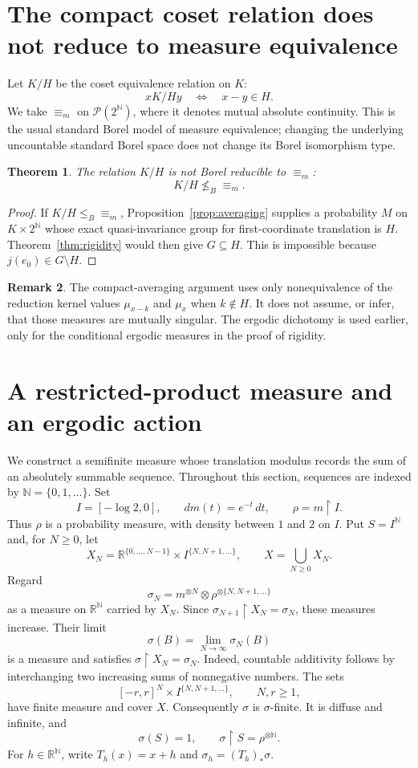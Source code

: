 \documentclass[11pt]{article}
\newtheorem{theorem}{Theorem}[section]
\theoremstyle{definition}
\newtheorem{remark}[theorem]{Remark}
\newcommand{\N}{\mathbb N}
\newcommand{\R}{\mathbb R}
\newcommand{\Prob}{\mathcal P}
\newcommand{\ME}{\mathrel{\equiv_m}}
\newcommand{\leB}{\mathrel{\leq_B}}
\newcommand{\nleB}{\mathrel{\nleq_B}}
\begin{document}
\section{The compact coset relation does not reduce to measure equivalence}
\label{sec:coset-nonreduction}

Let $K/H$ be the coset equivalence relation on $K$:
\[
 x\mathrel{K/H}y\quad\Longleftrightarrow\quad x-y\in H.
\]
We take $\ME$ on $\Prob(2^{\N})$, where it denotes mutual absolute
continuity. This is the usual standard Borel model of measure
equivalence; changing the underlying uncountable standard Borel space
does not change its Borel isomorphism type.

\begin{theorem}\label{thm:nonreduction}
The relation $K/H$ is not Borel reducible to $\ME$:
\[
 K/H\nleB\ME.
\]
\end{theorem}

\begin{proof}
If $K/H\leB{\equiv_m}$, Proposition~\ref{prop:averaging} supplies a
probability $M$ on $K\times2^\N$ whose exact quasi-invariance group
for first-coordinate translation is $H$. Theorem~\ref{thm:rigidity}
would then give $G\subseteq H$. This is impossible because
$j(e_0)\in G\setminus H$.
\end{proof}

\begin{remark}
The compact-averaging argument uses only nonequivalence of the reduction
kernel values $\mu_{x-k}$ and $\mu_x$ when $k\notin H$. It does not
assume, or infer, that those measures
are mutually singular. The ergodic dichotomy is used earlier, only
for the conditional ergodic measures in the proof of rigidity.
\end{remark}
\section{A restricted-product measure and an ergodic action}
\label{sec:restricted-product}

We construct a semifinite measure whose translation modulus records the
sum of an absolutely summable sequence. Throughout this section, sequences
are indexed by $\N=\{0,1,\ldots\}$.
Set
\[
 I=[-\log 2,0],\qquad dm(t)=e^{-t}\,dt,\qquad \rho=m\mathbin{\upharpoonright}I.
\]
Thus $\rho$ is a probability measure, with density between $1$ and $2$ on
$I$. Put $S=I^{\N}$ and, for $N\geq0$, let
\[
 X_N=\R^{\{0,\ldots,N-1\}}\times I^{\{N,N+1,\ldots\}},
 \qquad X=\bigcup_{N\geq0}X_N.
\]
Regard
\[
 \sigma_N=m^{\otimes N}\otimes\rho^{\otimes\{N,N+1,\ldots\}}
\]
as a measure on $\R^{\N}$ carried by $X_N$. Since
$\sigma_{N+1}\mathbin{\upharpoonright}X_N=\sigma_N$, these measures increase.
Their limit
\[
 \sigma(B)=\lim_{N\to\infty}\sigma_N(B)
\]
is a measure and satisfies $\sigma\mathbin{\upharpoonright}X_N=\sigma_N$.
Indeed, countable additivity follows by interchanging two increasing sums
of nonnegative numbers. The sets
\[
 [-r,r]^N\times I^{\{N,N+1,\ldots\}},\qquad N,r\geq1,
\]
have finite measure and cover $X$. Consequently $\sigma$ is
$\sigma$-finite. It is diffuse and infinite, and
\[
 \sigma(S)=1,\qquad \sigma\mathbin{\upharpoonright}S=\rho^{\otimes\N}.
\]
For $h\in\R^{\N}$, write $T_h(x)=x+h$ and
$\sigma_h=(T_h)_*\sigma$.
\end{document}
